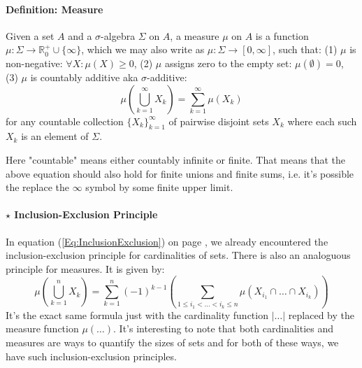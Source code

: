 \paragraph{Definition: Measure} Given a set $A$ and a $\sigma$-algebra $\Sigma$ on $A$, a measure $\mu$ on $A$ is a function $\mu: \Sigma \rightarrow \mathbb{R}^+_0 \cup \{  \infty \}$, which we may also write as $\mu: \Sigma \rightarrow [0, \infty]$, such that: (1) $\mu$ is non-negative: $\forall X: \mu(X) \geq 0$, (2) $\mu$ assigns zero to the empty set: $\mu(\emptyset) = 0$, (3) $\mu$ is countably additive aka $\sigma$-additive:
\begin{equation}
\mu \left( \bigcup_{k=1}^{\infty} X_k \right) = \sum_{k=1}^{\infty}	\mu(X_k)
\end{equation}
for any countable collection $\{X_k\}_{k=1}^{\infty}$ of pairwise disjoint sets $X_k$ where each such $X_k$ is an element of $\Sigma$.

\medskip
Here "countable" means either countably infinite or finite. That means that the above equation should also hold for finite unions and finite sums, i.e. it's possible the replace the $\infty$ symbol by some finite upper limit.




\paragraph{$\star$ Inclusion-Exclusion Principle}
In equation (\ref{Eq:InclusionExclusion}) on page \pageref{Eq:InclusionExclusion}, we already encountered the inclusion-exclusion principle for cardinalities of sets. There is also an analoguous principle for measures. It is given by: 
\begin{equation}
\mu \left( \bigcup_{k=1}^{n} X_k \right) = 
\sum_{k=1}^{n} (-1)^{k-1} 
 \left( \sum_{1 \le i_1 < \dots < i_k \le n} \mu ( X_{i_1} \cap \dots \cap X_{i_k} ) \right)
\end{equation}
It's the exact same formula just with the cardinality function $|\ldots|$ replaced by the measure function $\mu(\ldots)$. It's interesting to note that both cardinalities and measures are ways to quantify the sizes of sets and for both of these ways, we have such inclusion-exclusion principles.

